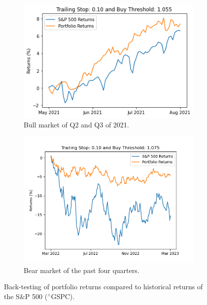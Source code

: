 \documentclass{article}
\begin{document}
\begin{figure}[H]
    \centering
    \begin{subfigure}{0.495\textwidth}
        \centering
        \includegraphics[width=\linewidth]{bullPlot.png}
        \caption{Bull market of Q2 and Q3 of 2021.}
        \label{fig:bullPlot}
    \end{subfigure}
    \hfill
    \begin{subfigure}{0.495\textwidth}
        \centering
        \includegraphics[width=\linewidth]{bearPlot.png}
        \caption{Bear market of the past four quarters.}
        \label{fig:bearPlot}
    \end{subfigure}
    \caption{Back-testing of portfolio returns compared to historical returns of the S$\&$P 500  ($^\wedge$GSPC).}
    \label{fig:portfolio}
\end{figure}
\end{document}
